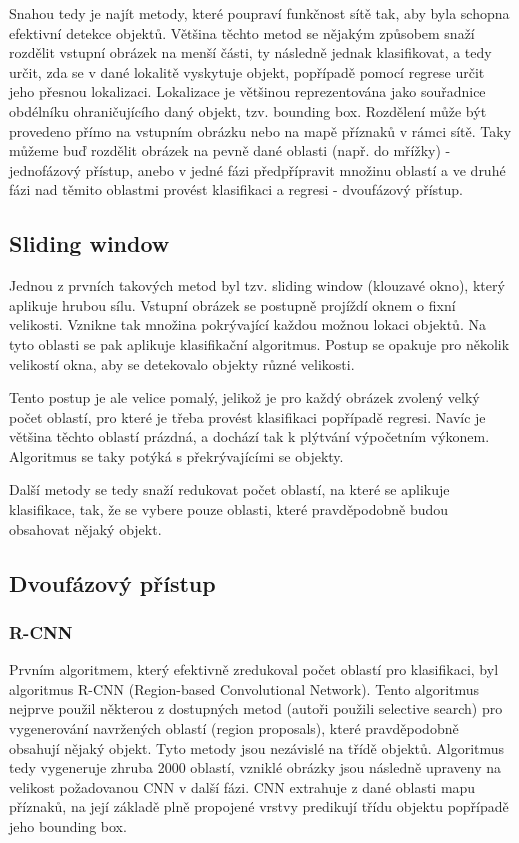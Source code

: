 Snahou tedy je najít metody, které poupraví funkčnost sítě tak, aby byla
schopna efektivní detekce objektů. Většina těchto metod se nějakým způsobem
snaží rozdělit vstupní obrázek na menší části, ty následně jednak klasifikovat,
a tedy určit, zda se v dané lokalitě vyskytuje objekt, popřípadě pomocí regrese
určit jeho přesnou lokalizaci. Lokalizace je většinou reprezentována jako
souřadnice obdélníku ohraničujícího daný objekt, tzv. bounding box. Rozdělení
může být provedeno přímo na vstupním obrázku nebo na mapě příznaků v rámci
sítě. Taky můžeme buď rozdělit obrázek na pevně dané oblasti (např. do mřížky)
- jednofázový přístup, anebo v jedné fázi předpřípravit množinu oblastí a ve
druhé fázi nad těmito oblastmi provést klasifikaci a regresi - dvoufázový
přístup.

\subsection{Sliding window}

Jednou z prvních takových metod byl tzv. sliding window (klouzavé okno), který
aplikuje hrubou sílu. Vstupní obrázek se postupně projíždí oknem o fixní
velikosti. Vznikne tak množina pokrývající každou možnou lokaci objektů. Na
tyto oblasti se pak aplikuje klasifikační algoritmus. Postup se opakuje pro
několik velikostí okna, aby se detekovalo objekty různé velikosti.

Tento postup je ale velice pomalý, jelikož je pro každý obrázek zvolený velký
počet oblastí, pro které je třeba provést klasifikaci popřípadě regresi. Navíc
je většina těchto oblastí prázdná, a dochází tak k plýtvání výpočetním výkonem.
Algoritmus se taky potýká s překrývajícími se objekty.

Další metody se tedy snaží redukovat počet oblastí, na které se aplikuje
klasifikace, tak, že se vybere pouze oblasti, které pravděpodobně budou
obsahovat nějaký objekt.

\subsection{Dvoufázový přístup}

\subsubsection{R-CNN}
Prvním algoritmem, který efektivně zredukoval počet oblastí pro klasifikaci,
byl algoritmus R-CNN (Region-based Convolutional Network). \cite{r-cnn} Tento
algoritmus nejprve použil některou z dostupných metod (autoři použili selective
search) pro vygenerování navržených oblastí (region proposals), které
pravděpodobně obsahují nějaký objekt. Tyto metody jsou nezávislé na třídě
objektů. Algoritmus tedy vygeneruje zhruba 2000 oblastí, vzniklé obrázky jsou
následně upraveny na velikost požadovanou CNN v další fázi. CNN extrahuje z  
dané oblasti mapu příznaků, na její základě plně propojené vrstvy predikují
třídu objektu popřípadě jeho bounding box.

